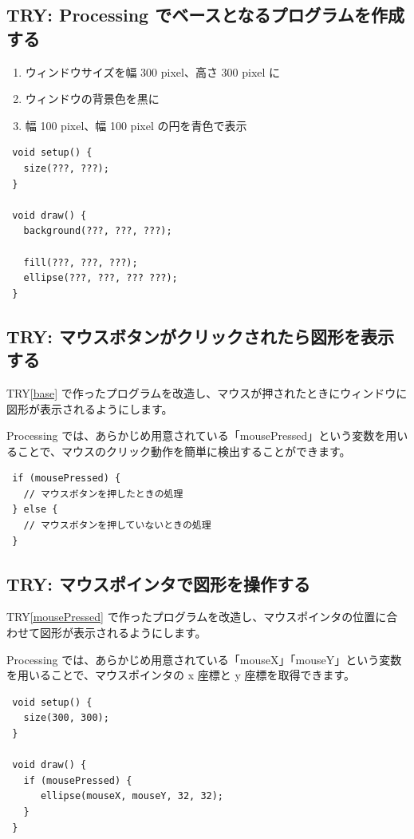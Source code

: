 \documentclass[11pt,a4paper]{jarticle}
\begin{document}
\subsection*{TRY\thenombre: Processing でベースとなるプログラムを作成する}

\begin{enumerate}
 \item ウィンドウサイズを幅 300 pixel、高さ 300 pixel に
 \item ウィンドウの背景色を黒に
 \item 幅 100 pixel、幅 100 pixel の円を青色で表示
\end{enumerate}

\begin{lstlisting}
 void setup() {
   size(???, ???);
 }

 void draw() {
   background(???, ???, ???);

   fill(???, ???, ???);
   ellipse(???, ???, ??? ???);
 }
\end{lstlisting}

\subsection*{TRY\thenombre: マウスボタンがクリックされたら図形を表示する}
\label{mousePressed}

TRY\ref{base} で作ったプログラムを改造し、マウスが押されたときにウィンドウに図形が表示されるようにします。

Processing では、あらかじめ用意されている「mousePressed」という変数を用いることで、マウスのクリック動作を簡単に検出することができます。
\begin{lstlisting}
 if (mousePressed) {
   // マウスボタンを押したときの処理
 } else {
   // マウスボタンを押していないときの処理
 }
\end{lstlisting}


\subsection*{TRY\thenombre: マウスポインタで図形を操作する}

TRY\ref{mousePressed} で作ったプログラムを改造し、マウスポインタの位置に合わせて図形が表示されるようにします。

Processing では、あらかじめ用意されている「mouseX」「mouseY」という変数を用いることで、マウスポインタの x 座標と y 座標を取得できます。


\begin{lstlisting}
 void setup() {
   size(300, 300);
 }

 void draw() {
   if (mousePressed) {
      ellipse(mouseX, mouseY, 32, 32);
   }
 }
\end{lstlisting}
\end{document}
